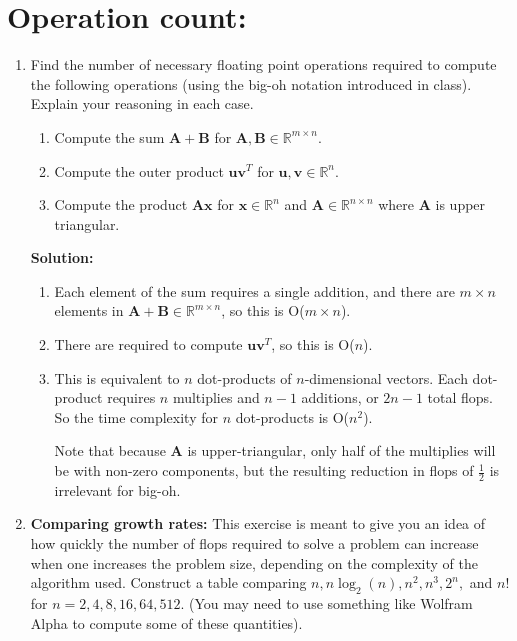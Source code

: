 \documentclass[]{article}
\newcommand{\half}{\frac{1}{2}}			%
\newcommand{\R}{\mathbb{R}}				%
\newcommand{\x}{\bm{x}}					%
\newcommand{\A}{\bm{A}}					%
\newcommand{\solution}{\vskip 0.5cm \textbf{\large Solution:} \\}
\begin{document}
    \section*{Operation count:}
    \begin{enumerate}[resume]
	\item Find the number of necessary floating point operations required to compute the following operations (using the big-oh notation introduced in class). Explain your reasoning in each case.
	  \begin{enumerate}
	  \item Compute the sum $\A+\bm{B}$ for $\A,\bm{B}\in\R^{m\times n}$.
	  \item Compute the outer product $\bm{uv}^T$ for $\bm{u},\bm{v}\in\R^n$.
	  \item Compute the product $\A\x$ for $\x\in\R^n$ and $\A\in\R^{n\times n}$ where $\A$ is upper triangular.
	  \end{enumerate}

	  \solution
	  \begin{enumerate}
	  \item
        Each element of the sum requires a single addition, and there
        are $m \times n$ elements in $\A + \bm{B} \in \R^{m \times n}$, so
        this is O($m \times n$).

      \item There are  required to
        compute $\bm{uv}^T$, so this is O($n$).

      \item This is equivalent to $n$ dot-products of $n$-dimensional
        vectors. Each dot-product requires $n$ multiplies and $n-1$
        additions, or $2n - 1$ total flops. So the time complexity for
        $n$ dot-products is O($n^2$).

        Note that because $\A$ is upper-triangular, only half of the
        multiplies will be with non-zero components, but the resulting
        reduction in flops of $\half$ is irrelevant for big-oh.
	  \end{enumerate}


	\item \textbf{Comparing growth rates:} This exercise is meant to
      give you an idea of how quickly the number of flops required to
      solve a problem can increase when one increases the problem
      size, depending on the complexity of the algorithm
      used. Construct a table comparing $n,n\log_2(n),n^2,n^3,2^n,$
      and $n!$ for $n=2,4,8,16,64,512$. (You may need to use something
      like Wolfram Alpha to compute some of these quantities).


\end{enumerate}
\end{document}
